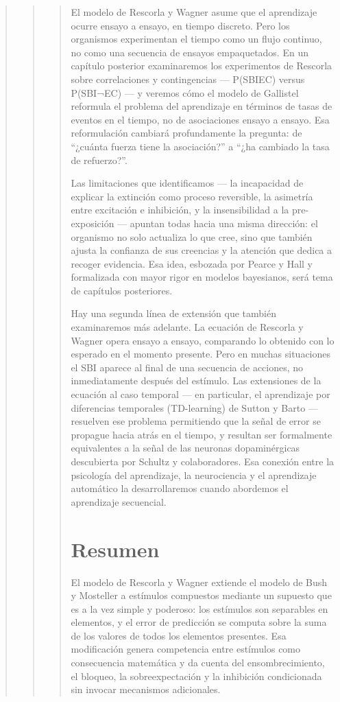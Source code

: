 \documentclass[
  letterpaper,
  DIV=11,
  numbers=noendperiod]{scrreprt}
\begin{document}
\begin{tcolorbox}[enhanced jigsaw, toprule=.15mm, arc=.35mm, colback=white, opacityback=0, colframe=quarto-callout-note-color-frame, breakable, rightrule=.15mm, left=2mm, leftrule=.75mm, bottomrule=.15mm]
\begin{quote}
\begin{quote}
\begin{quote}
El modelo de Rescorla y Wagner asume que el aprendizaje ocurre ensayo a
ensayo, en tiempo discreto. Pero los organismos experimentan el tiempo
como un flujo continuo, no como una secuencia de ensayos empaquetados.
En un capítulo posterior examinaremos los experimentos de Rescorla sobre
correlaciones y contingencias --- P(SBI\textbar EC) versus
P(SBI\textbar¬EC) --- y veremos cómo el modelo de Gallistel reformula el
problema del aprendizaje en términos de tasas de eventos en el tiempo,
no de asociaciones ensayo a ensayo. Esa reformulación cambiará
profundamente la pregunta: de ``¿cuánta fuerza tiene la asociación?'' a
``¿ha cambiado la tasa de refuerzo?''.

Las limitaciones que identificamos --- la incapacidad de explicar la
extinción como proceso reversible, la asimetría entre excitación e
inhibición, y la insensibilidad a la pre-exposición --- apuntan todas
hacia una misma dirección: el organismo no solo actualiza lo que cree,
sino que también ajusta la confianza de sus creencias y la atención que
dedica a recoger evidencia. Esa idea, esbozada por Pearce y Hall y
formalizada con mayor rigor en modelos bayesianos, será tema de
capítulos posteriores.

Hay una segunda línea de extensión que también examinaremos más
adelante. La ecuación de Rescorla y Wagner opera ensayo a ensayo,
comparando lo obtenido con lo esperado en el momento presente. Pero en
muchas situaciones el SBI aparece al final de una secuencia de acciones,
no inmediatamente después del estímulo. Las extensiones de la ecuación
al caso temporal --- en particular, el aprendizaje por diferencias
temporales (TD-learning) de Sutton y Barto --- resuelven ese problema
permitiendo que la señal de error se propague hacia atrás en el tiempo,
y resultan ser formalmente equivalentes a la señal de las neuronas
dopaminérgicas descubierta por Schultz y colaboradores. Esa conexión
entre la psicología del aprendizaje, la neurociencia y el aprendizaje
automático la desarrollaremos cuando abordemos el aprendizaje
secuencial.

\section{Resumen}\label{resumen-5}

El modelo de Rescorla y Wagner extiende el modelo de Bush y Mosteller a
estímulos compuestos mediante un supuesto que es a la vez simple y
poderoso: los estímulos son separables en elementos, y el error de
predicción se computa sobre la suma de los valores de todos los
elementos presentes. Esa modificación genera competencia entre estímulos
como consecuencia matemática y da cuenta del ensombrecimiento, el
bloqueo, la sobreexpectación y la inhibición condicionada sin invocar
mecanismos adicionales.


\end{quote}
\end{quote}
\end{quote}
\end{tcolorbox}
\end{document}
